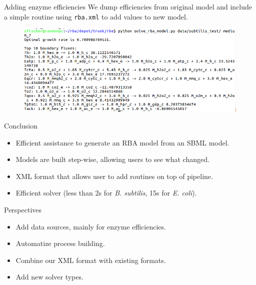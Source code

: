 \documentclass{beamer}
\begin{document}
\begin{frame}{Adding enzyme efficiencies}
  We dump efficiencies from original model and include a simple routine using
  \texttt{rba.xml} to add values to new model.
  \begin{figure}
    \centering
    \includegraphics[width=\linewidth]{added_enzyme_efficiencies}
  \end{figure}
\end{frame}


\begin{frame}{Conclusion}
  \begin{itemize}
    \item Efficient assistance to generate an RBA model from an SBML model.
    \item Models are built step-wise, allowing users to see what changed.
    \item XML format that allows user to add routines on top of pipeline.
    \item Efficient solver
    (less than 2s for \textit{B. subtilis}, 15s for \textit{E. coli}).
  \end{itemize}
\end{frame}

\begin{frame}{Perspectives}
  \begin{itemize}
    \item Add data sources, mainly for enzyme efficiencies.
    \item Automatize process building.
    \item Combine our XML format with existing formats.
    \item Add new solver types.
  \end{itemize}
\end{frame}


\appendix
{}
\setcounter{finalframe}{\value{framenumber}}


\setcounter{framenumber}{\value{finalframe}}
\end{document}
